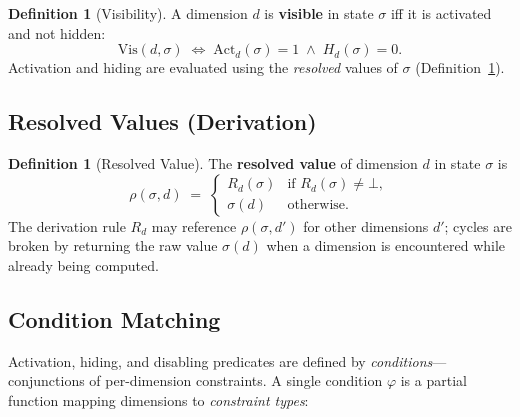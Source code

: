 \documentclass[11pt]{article}
\theoremstyle{definition}
\newtheorem{definition}[theorem]{Definition}
\newcommand{\sel}{\sigma}              %
\newcommand{\res}[2]{\rho(#1,#2)}      %
\newcommand{\Vis}{\mathrm{Vis}}        %
\newcommand{\Act}{\mathrm{Act}}        %
\begin{document}
\begin{definition}[Visibility]\label{def:vis}
A dimension $d$ is \textbf{visible} in state $\sel$ iff it is activated
and not hidden:
\[
  \Vis(d,\sel) \;\iff\; \Act_d(\sel) = 1 \;\wedge\; H_d(\sel) = 0.
\]
Activation and hiding are evaluated using the \emph{resolved} values of
$\sel$ (Definition~\ref{def:resolved}).
\end{definition}

\subsection{Resolved Values (Derivation)}

\begin{definition}[Resolved Value]\label{def:resolved}
The \textbf{resolved value} of dimension $d$ in state $\sel$ is
\[
  \res{\sel}{d} \;=\;
  \begin{cases}
    R_d(\sel) & \text{if } R_d(\sel) \neq \bot,\\
    \sel(d)   & \text{otherwise}.
  \end{cases}
\]
The derivation rule $R_d$ may reference $\res{\sel}{d'}$ for other
dimensions $d'$; cycles are broken by returning the raw value $\sel(d)$
when a dimension is encountered while already being computed.
\end{definition}

\subsection{Condition Matching}\label{sec:conditions}

Activation, hiding, and disabling predicates are defined by
\emph{conditions}---conjunctions of per-dimension constraints. A single
condition $\varphi$ is a partial function mapping dimensions to
\emph{constraint types}:
\end{document}
